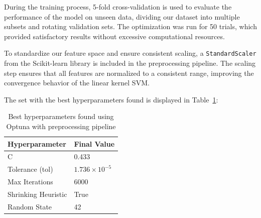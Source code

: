 \newpage

During the training process, 5-fold cross-validation is used to evaluate the performance of the model on unseen data, dividing our dataset into multiple subsets and rotating validation sets. The optimization was run for 50 trials, which provided satisfactory results without excessive computational resources. 

\vspace{3mm}

To standardize our feature space and ensure consistent scaling, a \texttt{StandardScaler} from the Scikit-learn library is included in the preprocessing pipeline. The scaling step ensures that all features are normalized to a consistent range, improving the convergence behavior of the linear kernel SVM.

\vspace{3mm}

The set with the best hyperparameters found is displayed in Table~\ref{tab:best_hyperparameters}:

\begin{table}[h!]
\centering
\renewcommand{\arraystretch}{1.3} %
\begin{tabular}{ll}
\hline
\textbf{Hyperparameter}  & \textbf{Final Value}          \\ \hline
C                        & 0.433                         \\ 
Tolerance (tol)          & $1.736 \times 10^{-5}$        \\ 
Max Iterations           & 6000                          \\ 
Shrinking Heuristic      & True                          \\ 
Random State             & 42                            \\ \hline
\end{tabular}
\caption{Best hyperparameters found using Optuna with preprocessing pipeline}
\label{tab:best_hyperparameters}
\end{table}

\vspace{3mm}







